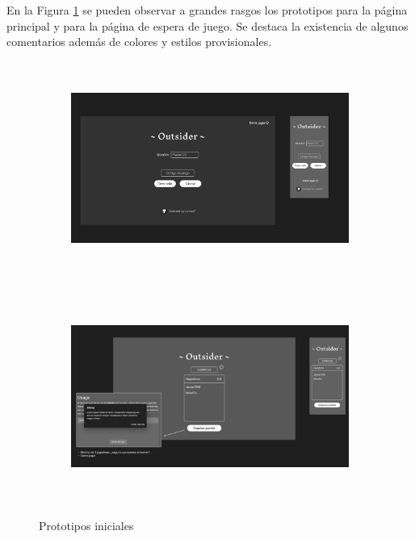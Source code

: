 En la Figura \ref{fig:res_designLanding} se pueden observar a grandes rasgos los 
prototipos para la página principal y para la página de espera de juego. Se destaca la existencia de algunos comentarios además de colores 
y estilos provisionales.


\begin{figure}[h]													
	\begin{subfigure}{\textwidth}
		\centering
		\includegraphics[height=7cm]{res_designLanding.png}
	\end{subfigure}
																																																																																																																																																																													
	\begin{subfigure}{\textwidth}
		\centering
		\includegraphics[height=7cm]{res_designLobby.png} 
	\end{subfigure}
																																																																																																																																																																																				
	\caption{Prototipos iniciales}
	\label{fig:res_designLanding}										
\end{figure}

